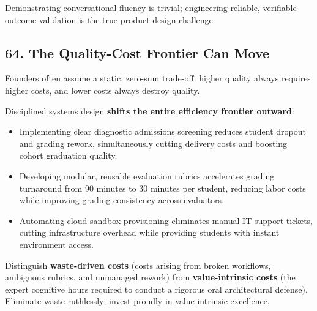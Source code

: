 Demonstrating conversational fluency is trivial; engineering reliable, verifiable outcome validation is the true product design challenge.

\subsection*{64. The Quality-Cost Frontier Can Move}

Founders often assume a static, zero-sum trade-off: higher quality always requires higher costs, and lower costs always destroy quality.

Disciplined systems design \textbf{shifts the entire efficiency frontier outward}:
\begin{itemize}
    \item Implementing clear diagnostic admissions screening reduces student dropout and grading rework, simultaneously cutting delivery costs and boosting cohort graduation quality.
    \item Developing modular, reusable evaluation rubrics accelerates grading turnaround from 90 minutes to 30 minutes per student, reducing labor costs while improving grading consistency across evaluators.
    \item Automating cloud sandbox provisioning eliminates manual IT support tickets, cutting infrastructure overhead while providing students with instant environment access.
\end{itemize}

Distinguish \textbf{waste-driven costs} (costs arising from broken workflows, ambiguous rubrics, and unmanaged rework) from \textbf{value-intrinsic costs} (the expert cognitive hours required to conduct a rigorous oral architectural defense). Eliminate waste ruthlessly; invest proudly in value-intrinsic excellence.

